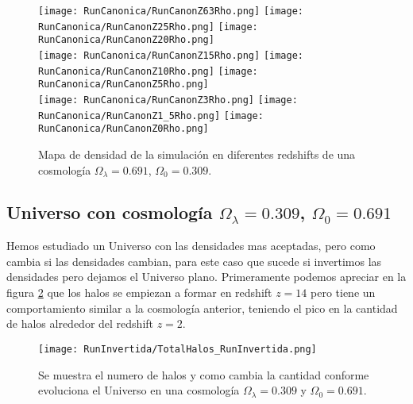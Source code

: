 \begin{figure}[H]
    \centering

    \texttt{[image: RunCanonica/RunCanonZ63Rho.png]}   %
    \texttt{[image: RunCanonica/RunCanonZ25Rho.png]}   %
    \texttt{[image: RunCanonica/RunCanonZ20Rho.png]}   %
    \\
    \texttt{[image: RunCanonica/RunCanonZ15Rho.png]}   %
    \texttt{[image: RunCanonica/RunCanonZ10Rho.png]}   %
    \texttt{[image: RunCanonica/RunCanonZ5Rho.png]}    %
    \\
    \texttt{[image: RunCanonica/RunCanonZ3Rho.png]}    %
    \texttt{[image: RunCanonica/RunCanonZ1\_5Rho.png]}  %
    \texttt{[image: RunCanonica/RunCanonZ0Rho.png]}    %
    \caption[Mapa de densidad de un Universo en en diferentes redshift]{ \footnotesize Mapa de densidad de la simulación en diferentes redshifts de una cosmología $\Omega_\lambda = 0.691 $, $\Omega_0 = 0.309$. }
    \label{fig:CanonRunDensityMap}
\end{figure}

\subsection{Universo con cosmología  \texorpdfstring{$\Omega_\lambda = 0.309$, $\Omega_0 = 0.691$ }{Omega lambda = 0.309, Omega 0 = 0.691} }
Hemos estudiado un Universo con las densidades mas aceptadas, pero como cambia si las densidades cambian, para este caso que sucede si invertimos las densidades pero dejamos el Universo plano. Primeramente podemos apreciar en la figura \ref{fig:Invertida-TotalHalos} que los halos se empiezan a formar en redshift $z=14$ pero tiene un comportamiento similar a la cosmología anterior, teniendo el pico en la cantidad de halos alrededor del redshift $z=2$. 

\begin{figure}[H]
    \centering
    \texttt{[image: RunInvertida/TotalHalos\_RunInvertida.png]}
    \caption[Evolución del número de halos en un Universo $\Omega_\lambda = 0.309 $, $\Omega_0 = 0.691$]{\footnotesize Se muestra el numero de halos y como cambia la cantidad conforme evoluciona el Universo en una cosmología $\Omega_\lambda = 0.309 $ y $\Omega_0 = 0.691$.}    
    \label{fig:Invertida-TotalHalos}
\end{figure}

